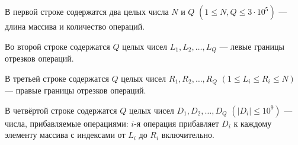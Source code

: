 В первой строке содержатся два целых числа $N$ и $Q$ $(1 \le N, Q \le 3 \cdot 10^5)$ --- длина массива и количество операций.

Во второй строке содержатся $Q$ целых чисел $L_1, L_2, \ldots, L_Q$ --- левые границы отрезков операций.

В третьей строке содержатся $Q$ целых чисел $R_1, R_2, \ldots, R_Q$ $(1 \le L_i \le R_i \le N)$ --- правые границы отрезков операций.

В четвёртой строке содержатся $Q$ целых чисел $D_1, D_2, \ldots, D_Q$ $(|D_i| \le 10^9)$ --- числа, прибавляемые операциями: $i$-я операция прибавляет $D_i$ к каждому элементу массива с индексами от $L_i$ до $R_i$ включительно.
